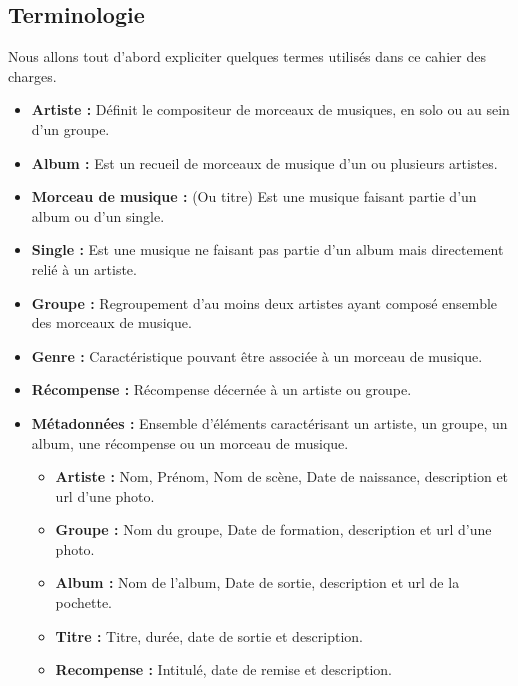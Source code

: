     \subsection{Terminologie}

        \begin{paragraphe}
            Nous allons tout d'abord expliciter quelques termes utilisés dans ce cahier des charges.
            \begin{itemize}
                \item \textbf{Artiste :} Définit le compositeur de morceaux de musiques, en solo ou au sein d'un groupe.
                \item \textbf{Album :} Est un recueil de morceaux de musique d'un ou plusieurs artistes.
                \item \textbf{Morceau de musique :} (Ou titre) Est une musique faisant partie d'un album ou d'un single.
                \item \textbf{Single :} Est une musique ne faisant pas partie d'un album mais directement relié à un artiste.
                \item \textbf{Groupe :} Regroupement d'au moins deux artistes ayant composé ensemble des morceaux de musique.
                \item \textbf{Genre :} Caractéristique pouvant être associée à un morceau de musique.
                \item \textbf{Récompense :} Récompense décernée à un artiste ou groupe.
                \item \textbf{Métadonnées :} Ensemble d'éléments caractérisant un artiste, un groupe, un album, une récompense ou un morceau de musique.
                \begin{itemize}
                    \item \textbf{Artiste :} Nom, Prénom, Nom de scène, Date de naissance, description et url d'une photo.
                    \item \textbf{Groupe :} Nom du groupe, Date de formation, description et url d'une photo.
                    \item \textbf{Album :} Nom de l'album, Date de sortie, description et url de la pochette.
                    \item \textbf{Titre :} Titre, durée, date de sortie et description.
                    \item \textbf{Recompense :} Intitulé, date de remise et description.
                \end{itemize}
            \end{itemize}
        \end{paragraphe}

